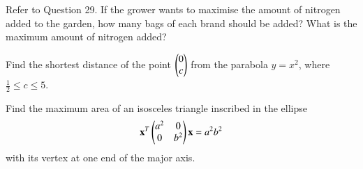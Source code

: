 \item Refer to Question 29. If the grower wants to maximise the amount of nitrogen
added to the garden, how many bags of each brand should be added? What is
the maximum amount of nitrogen added?\\
\item Find the shortest distance of the point $\begin{pmatrix}0\\c\end{pmatrix}$ from the parabola $y = x^2$, where $\frac{1}{2} \le c \le 5$.
\item Find the maximum area of an isosceles triangle inscribed in the ellipse 
%
\begin{align}
\mathbf{x}^T\begin{pmatrix}a^2 & 0 \\ 0 & b^2\end{pmatrix}\mathbf{x} = a^2b^2
\end{align}
%
with its vertex at one end of the major axis.



%
